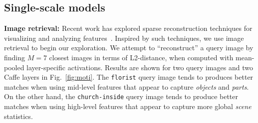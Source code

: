 \documentclass[10pt,twocolumn,letterpaper]{article}
\begin{document}
\subsection{Single-scale models} 

{\bf Image retrieval:} Recent work has explored sparse reconstruction techniques for visualizing and analyzing features~\cite{vondrick2013hoggles}. Inspired by such techniques, we use image retrieval to begin our exploration. We attempt to ``reconstruct'' a query image by finding $M=7$ closest images in terms of L2-distance, when computed with mean-pooled layer-specific activations. Results are shown for two query images and two Caffe layers in Fig.~\ref{fig:moti}. The {\tt florist} query image tends to produces better matches when using mid-level features that appear to capture \textit{objects} and \textit{parts}. On the other hand, the {\tt church-inside} query image tends to produce better matches when using high-level features that appear to capture more global \textit{scene} statistics.





\end{document}
